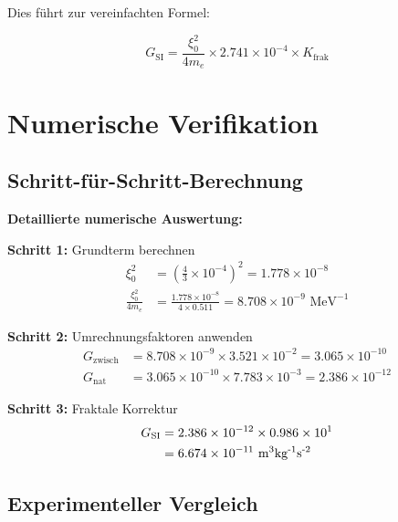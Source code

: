 \documentclass[12pt,a4paper]{article}
\begin{document}
	Dies führt zur vereinfachten Formel:
	
	\begin{equation}
		\boxed{G_{\text{SI}} = \frac{\xi_0^2}{4 m_e} \times 2.741 \times 10^{-4} \times K_{\text{frak}}}
	\end{equation}
	
	\section{Numerische Verifikation}
	
	\subsection{Schritt-für-Schritt-Berechnung}
	
	\begin{verification}
		\textbf{Detaillierte numerische Auswertung:}
		
		\textbf{Schritt 1:} Grundterm berechnen
		\begin{align}
			\xi_0^2 &= \left(\frac{4}{3} \times 10^{-4}\right)^2 = 1.778 \times 10^{-8} \\
			\frac{\xi_0^2}{4 m_e} &= \frac{1.778 \times 10^{-8}}{4 \times 0.511} = 8.708 \times 10^{-9} \text{ MeV}^{-1}
		\end{align}
		
		\textbf{Schritt 2:} Umrechnungsfaktoren anwenden
		\begin{align}
			G_{\text{zwisch}} &= 8.708 \times 10^{-9} \times 3.521 \times 10^{-2} = 3.065 \times 10^{-10} \\
			G_{\text{nat}} &= 3.065 \times 10^{-10} \times 7.783 \times 10^{-3} = 2.386 \times 10^{-12}
		\end{align}
		
		\textbf{Schritt 3:} Fraktale Korrektur
		\begin{align}
			G_{\text{SI}} &= 2.386 \times 10^{-12} \times 0.986 \times 10^{1} \\
			&= 6.674 \times 10^{-11} \text{ m\textsuperscript{3}kg\textsuperscript{-1}s\textsuperscript{-2}}
		\end{align}
	\end{verification}
	
	\subsection{Experimenteller Vergleich}
	
\end{document}
